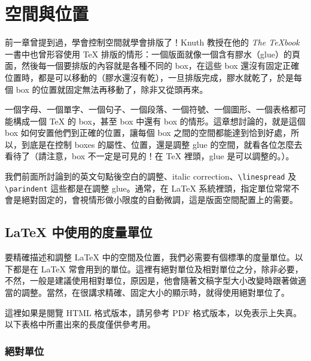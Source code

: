
\chapter{空間與位置}
\label{ch:space}

前一章曾提到過，學會控制空間就學會排版了！Knuth 教授在他的 \textit{The \TeX{}book} 一書中也曾形容使用 \TeX{} 排版的情形：一個版面就像一個含有膠水（glue）的頁面，然後每一個要排版的內容就是各種不同的 box，在這些 box 還沒有固定正確位置時，都是可以移動的（膠水還沒有乾），一旦排版完成，膠水就乾了，於是每個 box 的位置就固定無法再移動了，除非又從頭再來。

一個字母、一個單字、一個句子、一個段落、一個符號、一個圖形、一個表格都可能構成一個 \TeX{} 的 box，甚至 box 中還有 box 的情形。這章想討論的，就是這個 box 如何安置他們到正確的位置，讓每個 box 之間的空間都能達到恰到好處，所以，到底是在控制 boxes 的屬性、位置，還是調整 glue 的空間，就看各位怎麼去看待了（請注意，box 不一定是可見的！在 \TeX{} 裡頭，glue 是可以調整的。）。

我們前面所討論到的英文句點後空白的調整、italic correction、\verb|\linespread| 及 \verb|\parindent| 這些都是在調整 glue。通常，在 \LaTeX{} 系統裡頭，指定單位常常不會是絕對固定的，會視情形做小限度的自動微調，這是版面空間配置上的需要。

\section{\LaTeX{} 中使用的度量單位}
\label{sec:units}

要精確描述和調整 \LaTeX{} 中的空間及位置，我們必需要有個標準的度量單位。以下都是在 \LaTeX{} 常會用到的單位。這裡有絕對單位及相對單位之分，除非必要，不然，一般是建議使用相對單位，原因是，他會隨著文稿字型大小改變時跟著做適當的調整。當然，在很講求精確、固定大小的顯示時，就得使用絕對單位了。

這裡如果是閱覽 HTML 格式版本，請另參考 PDF 格式版本，以免表示上失真。以下表格中所畫出來的長度僅供參考用。

\subsection{絕對單位}

